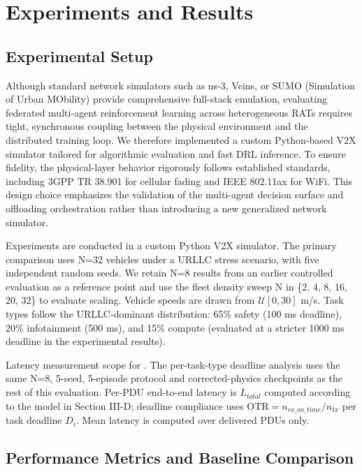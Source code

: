 \section{Experiments and Results}\label{sec:results}

\subsection{Experimental Setup}
Although standard network simulators such as ns-3, Veins, or SUMO (Simulation of Urban MObility) provide comprehensive full-stack emulation, evaluating federated multi-agent reinforcement learning across heterogeneous RATs requires tight, synchronous coupling between the physical environment and the distributed training loop. We therefore implemented a custom Python-based V2X simulator tailored for algorithmic evaluation and fast DRL inference. To ensure fidelity, the physical-layer behavior rigorously follows established standards, including 3GPP TR 38.901 for cellular fading and IEEE 802.11ax for WiFi. This design choice emphasizes the validation of the multi-agent decision surface and offloading orchestration rather than introducing a new generalized network simulator.



Experiments are conducted in a custom Python V2X simulator. The primary comparison uses N=32 vehicles under a URLLC stress scenario, with five independent random seeds. We retain N=8 results from an earlier controlled evaluation as a reference point and use the fleet density sweep N in \{2, 4, 8, 16, 20, 32\} to evaluate scaling. Vehicle speeds are drawn from $\mathcal{U}[0, 30]$ m/s. Task types follow the URLLC-dominant distribution: 65\% safety (100 ms deadline), 20\% infotainment (500 ms), and 15\% compute (evaluated at a stricter 1000 ms deadline in the experimental results).

Latency measurement scope for . The per-task-type deadline analysis uses the same N=8, 5-seed, 5-episode protocol and corrected-physics checkpoints as the rest of this evaluation. Per-PDU end-to-end latency is $L_{total}$ computed according to the model in Section III-D; deadline compliance uses $\text{OTR} = n_{rx\_on\_time}/n_{tx}$ per task deadline $D_i$. Mean latency is computed over delivered PDUs only.


\subsection{Performance Metrics and Baseline Comparison}

